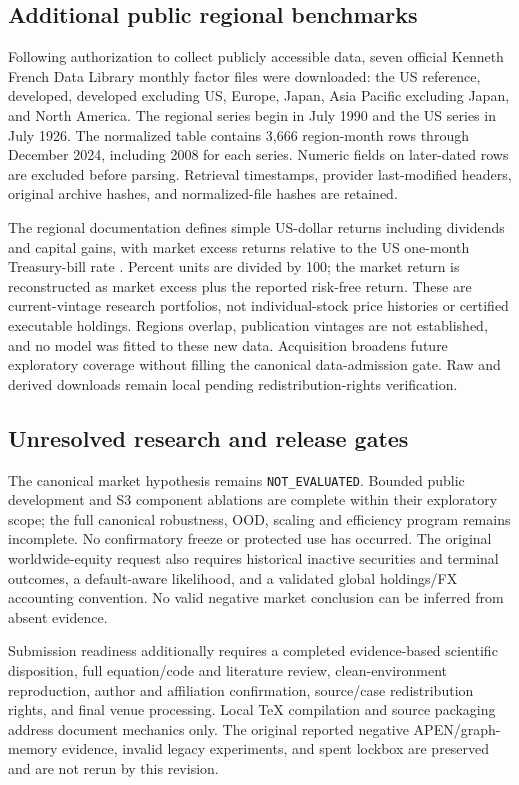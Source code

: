 \documentclass[11pt,a4paper]{article}
\begin{document}
\subsection{Additional public regional benchmarks}
Following authorization to collect publicly accessible data, seven official Kenneth French Data Library monthly factor files were downloaded: the US reference, developed, developed excluding US, Europe, Japan, Asia Pacific excluding Japan, and North America. The regional series begin in July 1990 and the US series in July 1926. The normalized table contains 3,666 region-month rows through December 2024, including 2008 for each series. Numeric fields on later-dated rows are excluded before parsing. Retrieval timestamps, provider last-modified headers, original archive hashes, and normalized-file hashes are retained.

The regional documentation defines simple US-dollar returns including dividends and capital gains, with market excess returns relative to the US one-month Treasury-bill rate \citep{frenchlibrary}. Percent units are divided by 100; the market return is reconstructed as market excess plus the reported risk-free return. These are current-vintage research portfolios, not individual-stock price histories or certified executable holdings. Regions overlap, publication vintages are not established, and no model was fitted to these new data. Acquisition broadens future exploratory coverage without filling the canonical data-admission gate. Raw and derived downloads remain local pending redistribution-rights verification.

\subsection{Unresolved research and release gates}
The canonical market hypothesis remains \texttt{NOT\_EVALUATED}. Bounded public development and S3 component ablations are complete within their exploratory scope; the full canonical robustness, OOD, scaling and efficiency program remains incomplete. No confirmatory freeze or protected use has occurred. The original worldwide-equity request also requires historical inactive securities and terminal outcomes, a default-aware likelihood, and a validated global holdings/FX accounting convention. No valid negative market conclusion can be inferred from absent evidence.

Submission readiness additionally requires a completed evidence-based scientific disposition, full equation/code and literature review, clean-environment reproduction, author and affiliation confirmation, source/case redistribution rights, and final venue processing. Local TeX compilation and source packaging address document mechanics only. The original reported negative APEN/graph-memory evidence, invalid legacy experiments, and spent lockbox are preserved and are not rerun by this revision.
\end{document}
